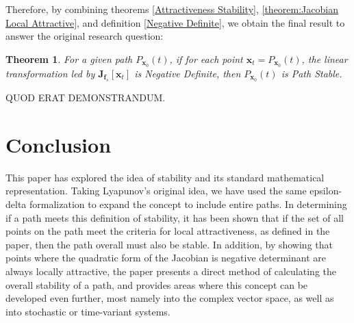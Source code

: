 \documentclass{article}
\newcommand{\B}[1]{\boldsymbol{#1}}
\newtheorem{theorem}{Theorem}[section]
\theoremstyle{definition}
\theoremstyle{remark}
\begin{document}
Therefore, by combining theorems \ref{Attractiveness Stability}, \ref{theorem:Jacobian Local Attractive}, and definition \ref{Negative Definite},
we obtain the final result to answer the original research question:

\begin{theorem} 
  \label{Negative Definite Path Stability}
  For a given path $P_{\B{x}_0}(t)$, if for each point $\B{x}_t = P_{\B{x}_0}(t)$,
  the linear transformation led by $\B{J}_{\B{f}_s}[\B{x}_t]$
  is Negative Definite, then $P_{\B{x}_0}(t)$ is Path Stable.
\end{theorem}
QUOD ERAT DEMONSTRANDUM.

\section{Conclusion}
This paper has explored the idea of stability and its standard mathematical 
representation. Taking Lyapunov's original idea, we have used the same
epsilon-delta formalization to expand the concept to include entire paths.
In determining if a path meets this definition of stability, it has been
shown that if the set of all points on the path meet the criteria for 
local attractiveness, as defined in the paper, then the path overall must 
also be stable. In addition, by showing that points where the quadratic form
of the Jacobian is negative determinant are always locally attractive, the paper
presents a direct method of calculating the overall stability of a path, and 
provides areas where this concept can be developed even further, most namely into
the complex vector space, as well as into stochastic or time-variant systems. 


\pagebreak
\medskip



\end{document}
